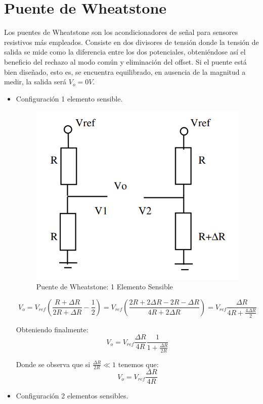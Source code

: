 \chapter{Puente de Wheatstone}

Los puentes de Wheatstone son los acondicionadores de señal para sensores resistivos más empleados. Consiste en dos divisores de tensión donde la tensión de salida se mide como la diferencia entre los dos potenciales, obteniéndose así el beneficio del rechazo al modo común y eliminación del offset. Si el puente está bien diseñado, esto es, se encuentra equilibrado, en ausencia de la magnitud a medir, la salida será $V_o = 0 V$.

\begin{itemize}
    \item Configuración 1 elemento sensible.
    \begin{figure}[H]
        \centering
        \includegraphics[width=0.4\linewidth]{Imagenes/Puente de Wheatstone 1.png}
        \caption{Puente de Wheatstone: 1 Elemento Sensible}
        \label{fig:wheatstone-1}
    \end{figure}
    
    \[V_o = V_{ref} \left( \frac{R + \Delta R}{2R + \Delta R} - \frac{1}{2} \right) = V_{ref}  \left( \frac{2R + 2\Delta R - 2R - \Delta R}{4R + 2 \Delta R} \right) = V_{ref}  \frac{\Delta R}{4R + \frac{4 \Delta R}{2}} \]
    
    Obteniendo finalmente:
    \begin{equation}
        V_o = V_{ref} \frac{\Delta R}{4R} \frac{1}{1 + \frac{\Delta R}{2R}}
    \end{equation}
    
    Donde se observa que si \(\frac{\Delta R}{2R} \ll 1\) tenemos que:
    \begin{equation}
        V_o = V_{ref}  \frac{\Delta R}{4R}
    \end{equation}
    
    \item Configuración 2 elementos sensibles.


\end{itemize}
